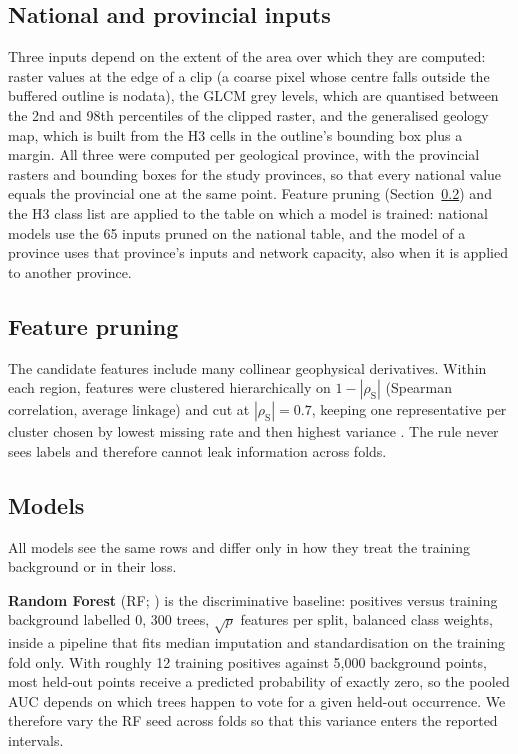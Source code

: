 \documentclass[pdflatex,sn-apa]{sn-jnl}
\begin{document}
\subsection{National and provincial inputs}\label{sec:framework}

Three inputs depend on the extent of the area over which they are computed: raster values at the edge of a clip (a coarse pixel whose centre falls outside the buffered outline is nodata), the GLCM grey levels, which are quantised between the 2nd and 98th percentiles of the clipped raster, and the generalised geology map, which is built from the H3 cells in the outline's bounding box plus a margin. All three were computed per geological province, with the provincial rasters and bounding boxes for the study provinces, so that every national value equals the provincial one at the same point. Feature pruning (Section~\ref{sec:pruning}) and the H3 class list are applied to the table on which a model is trained: national models use the 65 inputs pruned on the national table, and the model of a province uses that province's inputs and network capacity, also when it is applied to another province.

\subsection{Feature pruning}\label{sec:pruning}

The candidate features include many collinear geophysical derivatives. Within each region, features were clustered hierarchically on $1-|\rho_{\mathrm{S}}|$ (Spearman correlation, average linkage) and cut at $|\rho_{\mathrm{S}}| = 0.7$, keeping one representative per cluster chosen by lowest missing rate and then highest variance \citep{Dormann2013}. The rule never sees labels and therefore cannot leak information across folds.

\subsection{Models}\label{sec:models}

All models see the same rows and differ only in how they treat the training background or in their loss.

\textbf{Random Forest} (RF; \citealp{Breiman2001}) is the discriminative baseline: positives versus training background labelled 0, 300 trees, $\sqrt{p}$ features per split, balanced class weights, inside a pipeline that fits median imputation and standardisation on the training fold only. With roughly 12 training positives against 5,000 background points, most held-out points receive a predicted probability of exactly zero, so the pooled AUC depends on which trees happen to vote for a given held-out occurrence. We therefore vary the RF seed across folds so that this variance enters the reported intervals.
\end{document}

